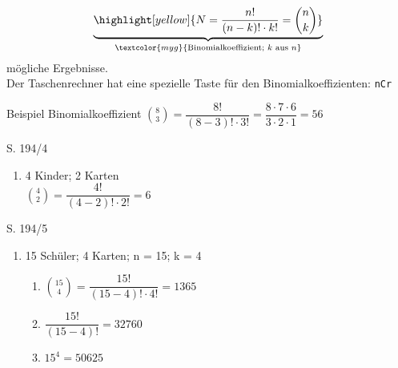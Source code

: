 \begin{note}
\begin{enumerate}[leftmargin=*]
{\begin{Corollary}{}{}
            \begin{equation*}
                \underbrace{\highlight[yellow]{N = \dfrac{n!}{(n - k)! \cdot k!} = \binom{n}{k}}}_{\textcolor{myg}{\text{Binomialkoeffizient; } k \text{ aus } n}}
            \end{equation*}
            mögliche Ergebnisse.\\[1.0ex]
            Der Taschenrechner hat eine spezielle Taste für den Binomialkoeffizienten: \quad \texttt{nCr}
        \end{Corollary}
        \begin{Example}{Beispiel Binomialkoeffizient}{}
            $\displaystyle \binom{8}{3} = \dfrac{8!}{(8 - 3)! \cdot 3!} = \dfrac{8 \cdot 7 \cdot 6}{3 \cdot 2 \cdot 1} = 56$
        \end{Example}
        }
\end{enumerate}
\end{note}

\pagebreak

\begin{Exercise}{S. 194/4}{}
\begin{enumerate}[leftmargin=*]
    \item [4.]{
        4 Kinder; 2 Karten\\[1.0ex]
        $\displaystyle \binom{4}{2} = \dfrac{4!}{(4 - 2)! \cdot 2!} = 6$
    }
\end{enumerate}
\end{Exercise}

\begin{Exercise}{S. 194/5}{}
\begin{enumerate}[leftmargin=*]
    \item [5.]{
        15 Schüler; 4 Karten; n = 15; k = 4\\[1.0ex]
        \begin{enumerate}[label=\alph*),leftmargin=*]
            \item[a)] {
                $\displaystyle \binom{15}{4} = \dfrac{15!}{(15 - 4)! \cdot 4!} = 1365$\\
                }
            \item[b)] {
                $\dfrac{15!}{(15-4)!} = 32760$\\
                }
            \item[c)] {
                $15^{4} = 50625$
                }
        \end{enumerate}
        }
\end{enumerate}
\end{Exercise}

